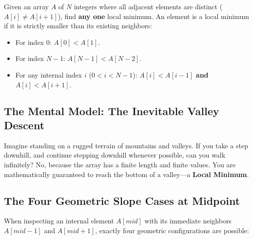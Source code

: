 \documentclass[10pt,journal,compsoc,onecolumn]{IEEEtran}
\begin{document}
Given an array $A$ of $N$ integers where all adjacent elements are distinct ($A[i] \neq A[i+1]$), find \textbf{any one} local minimum. An element is a local minimum if it is strictly smaller than its existing neighbors:
\begin{itemize}
    \item For index $0$: $A[0] < A[1]$.
    \item For index $N - 1$: $A[N - 1] < A[N - 2]$.
    \item For any internal index $i$ ($0 < i < N - 1$): $A[i] < A[i - 1]$ \textbf{and} $A[i] < A[i + 1]$.
\end{itemize}

\subsection{The Mental Model: The Inevitable Valley Descent}

Imagine standing on a rugged terrain of mountains and valleys. If you take a step downhill, and continue stepping downhill whenever possible, can you walk infinitely? 
No, because the array has a finite length and finite values. You are mathematically guaranteed to reach the bottom of a valley—a \textbf{Local Minimum}.

\subsection{The Four Geometric Slope Cases at Midpoint}

When inspecting an internal element $A[mid]$ with its immediate neighbors $A[mid - 1]$ and $A[mid + 1]$, exactly four geometric configurations are possible:
\end{document}

